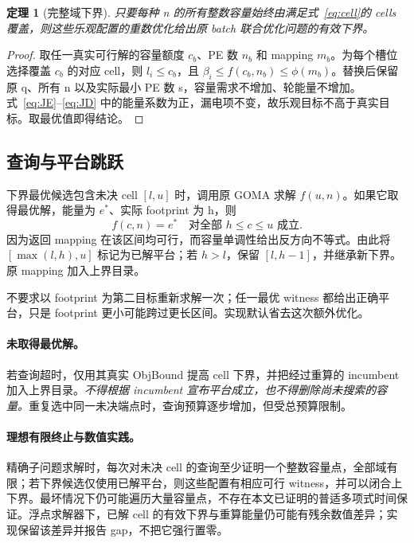 \documentclass[UTF8,11pt,a4paper,fontset=fandol]{ctexart}
\newtheorem{theorem}[proposition]{定理}
\theoremstyle{remark}\newtheorem{remark}[proposition]{说明}
\numberwithin{equation}{section}
\begin{document}
\begin{theorem}[完整域下界]
只要每种 n 的所有整数容量始终由满足式~\eqref{eq:cell}的 cells 覆盖，则这些乐观配置的重数优化给出原 batch 联合优化问题的有效下界。
\end{theorem}
\begin{proof}
取任一真实可行解的容量额度 $c_b$、PE 数 $n_b$ 和 mapping $m_b$。为每个槽位选择覆盖 $c_b$ 的对应 cell，则 $l_i\le c_b$，且 $\beta_i\le f(c_b,n_b)\le\phi(m_b)$。替换后保留原 q、所有 n 以及实际最小 PE 数 s，容量需求不增加、轮能量不增加。式~\eqref{eq:JE}--\eqref{eq:JD} 中的能量系数为正，漏电项不变，故乐观目标不高于真实目标。取最优值即得结论。
\end{proof}

\subsection{查询与平台跳跃}
下界最优候选包含未决 cell $[l,u]$ 时，调用原 GOMA 求解 $f(u,n)$。如果它取得最优解，能量为 $e^*$、实际 footprint 为 h，则
\begin{equation}
f(c,n)=e^*\quad\text{对全部 }h\le c\le u\text{ 成立}.
\label{eq:plateau}
\end{equation}
因为返回 mapping 在该区间均可行，而容量单调性给出反方向不等式。由此将 $[\max(l,h),u]$ 标记为已解平台；若 $h>l$，保留 $[l,h-1]$，并继承新下界。原 mapping 加入上界目录。

不要求以 footprint 为第二目标重新求解一次；任一最优 witness 都给出正确平台，只是 footprint 更小可能跨过更长区间。实现默认省去这次额外优化。

\paragraph{未取得最优解。}
若查询超时，仅用其真实 ObjBound 提高 cell 下界，并把经过重算的 incumbent 加入上界目录。\emph{不得根据 incumbent 宣布平台成立，也不得删除尚未搜索的容量。}重复选中同一未决端点时，查询预算逐步增加，但受总预算限制。

\paragraph{理想有限终止与数值实践。}
精确子问题求解时，每次对未决 cell 的查询至少证明一个整数容量点，全部域有限；若下界候选仅使用已解平台，则这些配置有相应可行 witness，并可以闭合上下界。最坏情况下仍可能遍历大量容量点，不存在本文已证明的普适多项式时间保证。浮点求解器下，已解 cell 的有效下界与重算能量仍可能有残余数值差异；实现保留该差异并报告 gap，不把它强行置零。
\end{document}
